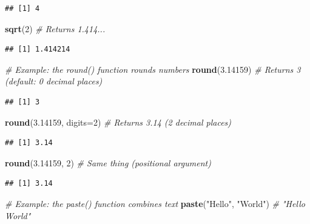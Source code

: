 \documentclass[
]{article}
\newenvironment{Shaded}{\begin{snugshade}}{\end{snugshade}}
\newcommand{\AttributeTok}[1]{\textcolor[rgb]{0.13,0.29,0.53}{#1}}
\newcommand{\CommentTok}[1]{\textcolor[rgb]{0.56,0.35,0.01}{\textit{#1}}}
\newcommand{\DecValTok}[1]{\textcolor[rgb]{0.00,0.00,0.81}{#1}}
\newcommand{\FloatTok}[1]{\textcolor[rgb]{0.00,0.00,0.81}{#1}}
\newcommand{\FunctionTok}[1]{\textcolor[rgb]{0.13,0.29,0.53}{\textbf{#1}}}
\newcommand{\NormalTok}[1]{#1}
\newcommand{\StringTok}[1]{\textcolor[rgb]{0.31,0.60,0.02}{#1}}
\begin{document}
\begin{verbatim}
## [1] 4
\end{verbatim}

\begin{Shaded}
\begin{Highlighting}[]
\FunctionTok{sqrt}\NormalTok{(}\DecValTok{2}\NormalTok{)       }\CommentTok{\# Returns 1.414...}
\end{Highlighting}
\end{Shaded}

\begin{verbatim}
## [1] 1.414214
\end{verbatim}

\begin{Shaded}
\begin{Highlighting}[]
\CommentTok{\# Example: the round() function rounds numbers}
\FunctionTok{round}\NormalTok{(}\FloatTok{3.14159}\NormalTok{)           }\CommentTok{\# Returns 3 (default: 0 decimal places)}
\end{Highlighting}
\end{Shaded}

\begin{verbatim}
## [1] 3
\end{verbatim}

\begin{Shaded}
\begin{Highlighting}[]
\FunctionTok{round}\NormalTok{(}\FloatTok{3.14159}\NormalTok{, }\AttributeTok{digits=}\DecValTok{2}\NormalTok{) }\CommentTok{\# Returns 3.14 (2 decimal places)}
\end{Highlighting}
\end{Shaded}

\begin{verbatim}
## [1] 3.14
\end{verbatim}

\begin{Shaded}
\begin{Highlighting}[]
\FunctionTok{round}\NormalTok{(}\FloatTok{3.14159}\NormalTok{, }\DecValTok{2}\NormalTok{)        }\CommentTok{\# Same thing (positional argument)}
\end{Highlighting}
\end{Shaded}

\begin{verbatim}
## [1] 3.14
\end{verbatim}

\begin{Shaded}
\begin{Highlighting}[]
\CommentTok{\# Example: the paste() function combines text}
\FunctionTok{paste}\NormalTok{(}\StringTok{"Hello"}\NormalTok{, }\StringTok{"World"}\NormalTok{)                    }\CommentTok{\# "Hello World"}
\end{Highlighting}
\end{Shaded}
\end{document}
